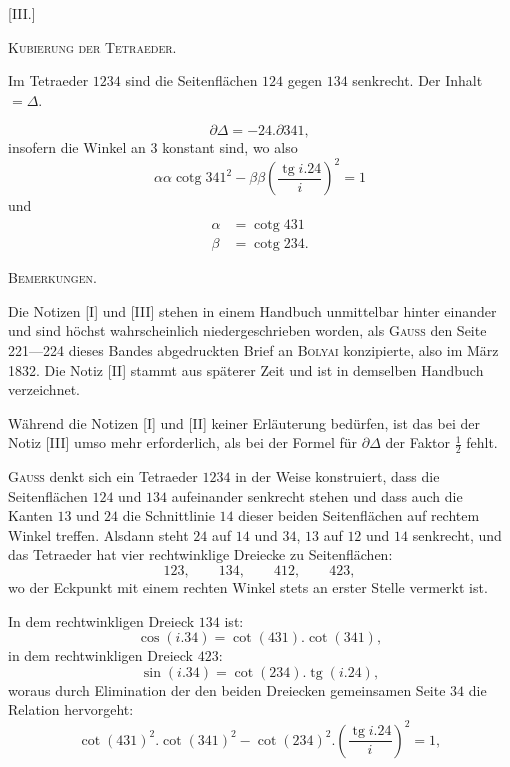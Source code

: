 %
\begin{center}[III.]\end{center}
\begin{center}\textsc{Kubierung der Tetraeder.}\end{center}
Im Tetraeder $1234$ sind die Seitenflächen $124$ gegen $134$ senkrecht. Der Inhalt $=\Delta$.
\begin{center}\end{center}
\[
\partial\Delta=-24.\partial341,
\]
insofern die Winkel an $3$ konstant sind, wo also
\[
\alpha\alpha\operatorname{cotg}341^{2}-\beta\beta\left(\frac{\operatorname{tg}i.24}{i}\right)^{2}=1
\]
und
\[
\begin{aligned}
\alpha&=\operatorname{cotg}431\\
\beta&=\operatorname{cotg}234.
\end{aligned}
\]

\begin{center}\textsc{Bemerkungen.}\end{center}
\begingroup\small
Die Notizen [I] und [III] stehen in einem Handbuch unmittelbar hinter einander und sind höchst wahrscheinlich niedergeschrieben worden, als \textsc{Gauss} den Seite 221—224 dieses Bandes abgedruckten Brief an \textsc{Bolyai} konzipierte, also im März 1832. Die Notiz [II] stammt aus späterer Zeit und ist in demselben Handbuch verzeichnet.

Während die Notizen [I] und [II] keiner Erläuterung bedürfen, ist das bei der Notiz [III] umso mehr erforderlich, als bei der Formel für $\partial\Delta$ der Faktor $\frac{1}{2}$ fehlt.

\textsc{Gauss} denkt sich ein Tetraeder $1234$ in der Weise konstruiert, dass die Seitenflächen $124$ und $134$ aufeinander senkrecht stehen und dass auch die Kanten $13$ und $24$ die Schnittlinie $14$ dieser beiden Seitenflächen auf rechtem Winkel treffen. Alsdann steht $24$ auf $14$ und $34$, $13$ auf $12$ und $14$ senkrecht, und das Tetraeder hat vier rechtwinklige Dreiecke zu Seitenflächen:
\[
123,\qquad134,\qquad412,\qquad423,
\]
wo der Eckpunkt mit einem rechten Winkel stets an erster Stelle vermerkt ist.

In dem rechtwinkligen Dreieck $134$ ist:
\[
\cos(i.34)=\cot(431).\cot(341),
\]
in dem rechtwinkligen Dreieck $423$:
\[
\sin(i.34)=\cot(234).\operatorname{tg}(i.24),
\]
woraus durch Elimination der den beiden Dreiecken gemeinsamen Seite $34$ die Relation hervorgeht:
\[
\cot(431)^{2}.\cot(341)^{2}-\cot(234)^{2}.\left(\frac{\operatorname{tg}i.24}{i}\right)^{2}=1,
\]
